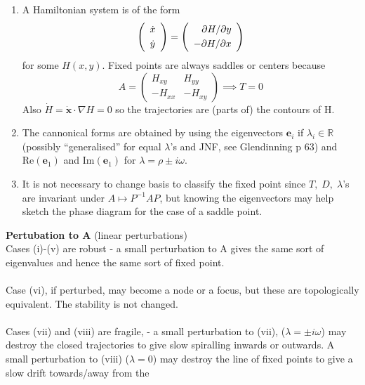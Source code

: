 \documentclass{article}
\begin{document}
\begin{enumerate}[(1)]
\item A Hamiltonian system is of the form
\[ \left( \begin{array}{c} \dot{x} \vspace{1mm}\\ \dot{y} \end{array} \right) =
\left( \begin{array}{r} \partial H / \partial y \vspace{1mm}\\ - \partial H / \partial x \end{array} \right) \]
for some $H(x,y)$. Fixed points are always saddles or centers because
\[ A = \left( \begin{array}{rr} H_{xy} & H_{yy} \\ -H_{xx} & -H_{xy} \end{array} \right) \implies T = 0 \]
Also $\dot{H} = \dot{\bm{x}}\cdot \nabla H = 0$ so the trajectories are
 (parts of) the contours of H.

\item The cannonical forms are obtained by using the eigenvectors $\bm{e}_i$ if
$\lambda _ i \in \mathbb{R}$ (possibly ``generalised'' for equal $\lambda$'s
and JNF, see Glendinning p 63) and $\mathrm{Re}(\bm{e}_1)$ and $\mathrm{Im}(\bm{e}_1)$ for 
$\lambda = \rho \pm i \omega$.

\item It is not necessary to change basis to classify the fixed point since
$T, \; D, \; \lambda$'s are invariant under $A \mapsto P^{-1}AP$, but knowing 
the eigenvectors may help sketch the phase diagram for the case of a saddle 
point.
\end{enumerate}
%
\textbf{Pertubation to A} (linear perturbations) 
\\
Cases (i)-(v) are robust - a small perturbation to A gives the same sort of 
eigenvalues and hence the same sort of fixed point.
\\
\\
Case (vi), if perturbed, may become a node or a focus, but these are 
topologically equivalent. The stability is not changed.
\\
\\
Cases (vii) and (viii) are fragile, - a small perturbation to (vii),
($\lambda = \pm i \omega$) may destroy the closed trajectories to give slow
spiralling inwards or outwards. A small perturbation to (viii) ($\lambda = 0$) 
may destroy the line of fixed points to give a slow drift towards/away from the
\end{document}
